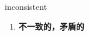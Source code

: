 
\begin{frame}
{\huge inconsistent}
\begin{center}
\begin{enumerate}\Large
  \item \textbf{不一致的，矛盾的}
\end{enumerate}
\end{center}
\end{frame}

